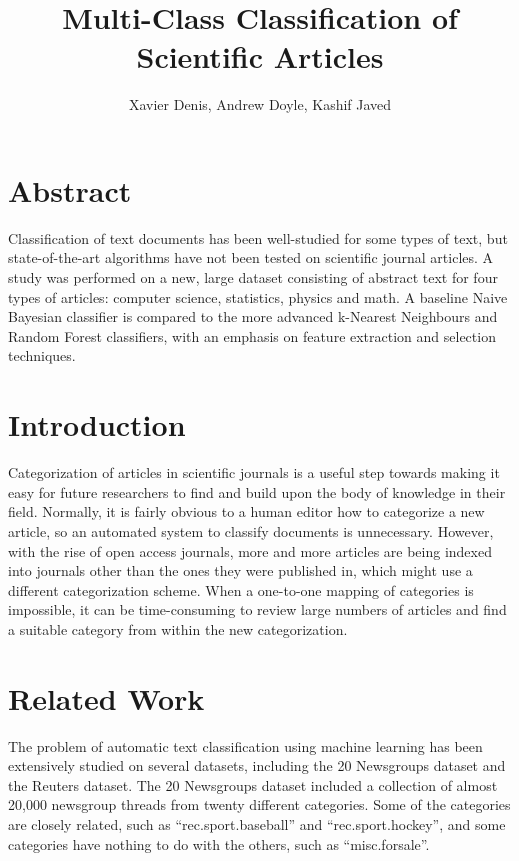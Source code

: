 \documentclass[10pt,twocolumn]{article}
\title {Multi-Class Classification of Scientific Articles}
\author {Xavier Denis, Andrew Doyle, Kashif Javed}
\begin{document}
\maketitle
\section*{Abstract}

Classification of text documents has been well-studied for some types of text, but state-of-the-art algorithms have not been tested on scientific journal articles.  A study was performed on a new, large dataset consisting of abstract text for four types of articles: computer science, statistics, physics and math. A baseline Naive Bayesian classifier is compared to the more advanced k-Nearest Neighbours and Random Forest classifiers, with an emphasis on feature extraction and selection techniques.

\section*{Introduction}

Categorization of articles in scientific journals is a useful step towards making it easy for future researchers to find and build upon the body of knowledge in their field. Normally, it is fairly obvious to a human editor how to categorize a new article, so an automated system to classify documents is unnecessary.  However, with the rise of open access journals, more and more articles are being indexed into journals other than the ones they were published in, which might use a different categorization scheme.  When a one-to-one mapping of categories is impossible, it can be time-consuming to review large numbers of articles and find a suitable category from within the new categorization.

\section*{Related Work}

The problem of automatic text classification using machine learning has been extensively studied on several datasets, including the 20 Newsgroups dataset and the Reuters dataset.  The 20 Newsgroups dataset included a collection of almost 20,000 newsgroup threads from twenty different categories.  Some of the categories are closely related, such as ``rec.sport.baseball'' and ``rec.sport.hockey'', and some categories have nothing to do with the others, such as ``misc.forsale''.
\end{document}
